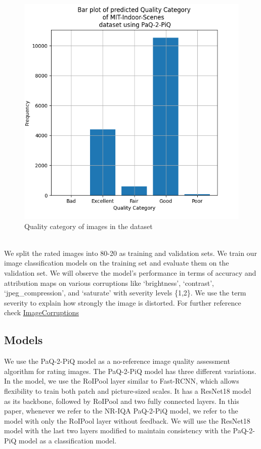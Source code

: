 \documentclass[10pt,twocolumn,letterpaper]{article}
\begin{document}
\begin{figure}[!ht]
    \centering
    \includegraphics[width=\columnwidth]{Images/Quality_Category_Histogram.png}
    \caption{Quality category of images in the dataset}
\end{figure}\\

We split the rated images into 80-20 as training and validation sets. We train our image classification models on the training set and evaluate them on the validation set.
We will observe the model's performance in terms of accuracy and attribution maps on various corruptions like `brightness', `contrast', `jpeg_compression', and `saturate' with severity levels \{1,2\}. We use the term severity to explain how strongly the image is distorted. For further reference check \href{https://github.com/bethgelab/imagecorruptions}{ImageCorruptions}\\

\subsection{Models}
We use the PaQ-2-PiQ model as a no-reference image quality assessment algorithm for rating images. The PaQ-2-PiQ model has three different variations. In the model, we use the RoIPool layer similar to Fast-RCNN, which allows flexibility to train both patch and picture-sized scales. It has a ResNet18 model as its backbone, followed by RoIPool and two fully connected layers. In this paper, whenever we refer to the NR-IQA PaQ-2-PiQ model, we refer to the model with only the RoIPool layer without feedback. We will use the ResNet18 model with the last two layers modified to maintain consistency with the PaQ-2-PiQ model as a classification model. 
\end{document}
